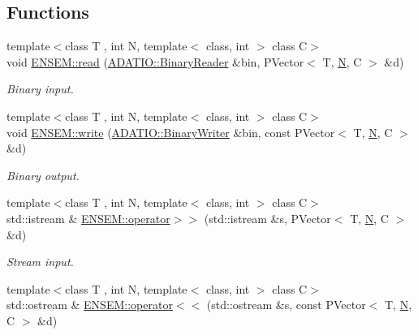 \subsection*{Functions}
\begin{DoxyCompactItemize}
\item 
{\footnotesize template$<$class T , int N, template$<$ class, int $>$ class C$>$ }\\void \mbox{\hyperlink{group__primvector_ga7490c5f7d1484d1500da031d977a1217}{E\+N\+S\+E\+M\+::read}} (\mbox{\hyperlink{classADATIO_1_1BinaryReader}{A\+D\+A\+T\+I\+O\+::\+Binary\+Reader}} \&bin, P\+Vector$<$ T, \mbox{\hyperlink{adat__devel_2lib_2hadron_2operator__name__util_8cc_a7722c8ecbb62d99aee7ce68b1752f337}{N}}, C $>$ \&d)
\begin{DoxyCompactList}\small\item\em Binary input. \end{DoxyCompactList}\item 
{\footnotesize template$<$class T , int N, template$<$ class, int $>$ class C$>$ }\\void \mbox{\hyperlink{group__primvector_ga06b3a608b1c1724f947b9a83bb506880}{E\+N\+S\+E\+M\+::write}} (\mbox{\hyperlink{classADATIO_1_1BinaryWriter}{A\+D\+A\+T\+I\+O\+::\+Binary\+Writer}} \&bin, const P\+Vector$<$ T, \mbox{\hyperlink{adat__devel_2lib_2hadron_2operator__name__util_8cc_a7722c8ecbb62d99aee7ce68b1752f337}{N}}, C $>$ \&d)
\begin{DoxyCompactList}\small\item\em Binary output. \end{DoxyCompactList}\item 
{\footnotesize template$<$class T , int N, template$<$ class, int $>$ class C$>$ }\\std\+::istream \& \mbox{\hyperlink{group__primvector_ga4bea3f831d6562a5cb0379de835c6843}{E\+N\+S\+E\+M\+::operator$>$$>$}} (std\+::istream \&s, P\+Vector$<$ T, \mbox{\hyperlink{adat__devel_2lib_2hadron_2operator__name__util_8cc_a7722c8ecbb62d99aee7ce68b1752f337}{N}}, C $>$ \&d)
\begin{DoxyCompactList}\small\item\em Stream input. \end{DoxyCompactList}\item 
{\footnotesize template$<$class T , int N, template$<$ class, int $>$ class C$>$ }\\std\+::ostream \& \mbox{\hyperlink{group__primvector_ga6745ec17233acc0af26851238d72789a}{E\+N\+S\+E\+M\+::operator$<$$<$}} (std\+::ostream \&s, const P\+Vector$<$ T, \mbox{\hyperlink{adat__devel_2lib_2hadron_2operator__name__util_8cc_a7722c8ecbb62d99aee7ce68b1752f337}{N}}, C $>$ \&d)

\end{DoxyCompactItemize}
